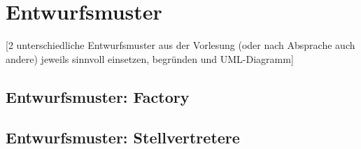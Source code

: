 \chapter{Entwurfsmuster}
[2 unterschiedliche Entwurfsmuster aus der Vorlesung (oder nach Absprache auch andere) jeweils sinnvoll einsetzen, begründen und UML-Diagramm]

\section{Entwurfsmuster:  Factory}
\section{Entwurfsmuster:  Stellvertretere}
